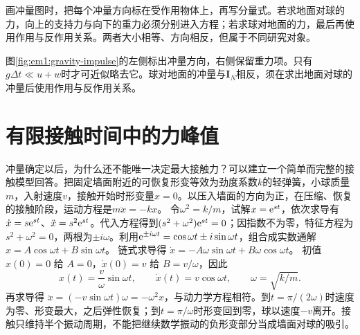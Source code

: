 画冲量图时，把每个冲量方向标在受作用物体上，再写分量式。若求地面对球的力，向上的支持力与向下的重力必须分别进入方程；若求球对地面的力，最后再使用作用与反作用关系。两者大小相等、方向相反，但属于不同研究对象。

图\ref{fig:em1:gravity-impulse}的左侧标出冲量方向，右侧保留重力项。只有$g\Delta t\ll u+w$时才可近似略去它。球对地面的冲量与$\bm I_N$相反，须在求出地面对球的冲量后使用作用与反作用关系。


\section{有限接触时间中的力峰值}

冲量确定以后，为什么还不能唯一决定最大接触力？可以建立一个简单而完整的接触模型回答。把固定墙面附近的可恢复形变等效为劲度系数$k$的轻弹簧，小球质量$m$，入射速度$v$，接触开始时形变量$x=0$。以压入墙面的方向为正，在压缩、恢复的接触阶段，运动方程是$m\ddot x=-kx$。
令$\omega^2=k/m$，试解$x=\mathrm e^{st}$，依次求导有$\dot x=s\mathrm e^{st}$、$\ddot x=s^2\mathrm e^{st}$。代入方程得到$(s^2+\omega^2)\mathrm e^{st}=0$；因指数不为零，特征方程为$s^2+\omega^2=0$，两根为$\pm i\omega$。利用$\mathrm e^{\pm i\omega t}=\cos\omega t\pm i\sin\omega t$，组合成实数通解$x=A\cos\omega t+B\sin\omega t$。
链式求导得 $\dot x=-A\omega\sin\omega t+B\omega\cos\omega t$。
初值 $x(0)=0$ 给 $A=0$，$\dot x(0)=v$ 给 $B=v/\omega$，因此
\[x(t)=\frac v\omega\sin\omega t,\qquad\dot x(t)=v\cos\omega t,\qquad\omega=\sqrt{k/m}.\]
再求导得 $\ddot x=(-v\sin\omega t)\omega=-\omega^2x$，与动力学方程相符。到$t=\pi/(2\omega)$时速度为零、形变最大，之后弹性恢复；到$t=\pi/\omega$时形变回到零，球以速度$-v$离开。接触只维持半个振动周期，不能把继续数学振动的负形变部分当成墙面对球的吸引。

